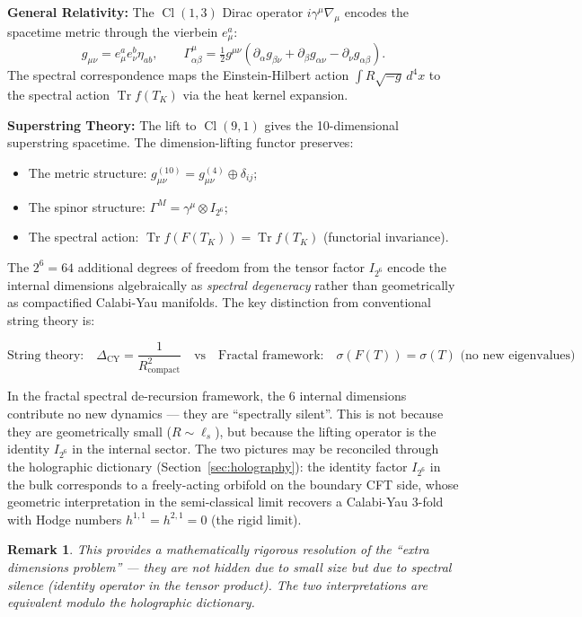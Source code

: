 \documentclass[12pt,a4paper]{article}
\newtheorem{remark}[theorem]{Remark}
\newcommand{\Cl}{\operatorname{Cl}}
\newcommand{\Tr}{\operatorname{Tr}}
\begin{document}
\textbf{General Relativity:} The $\Cl(1,3)$ Dirac operator $i\gamma^\mu\nabla_\mu$ encodes 
the spacetime metric through the vierbein $e^a_\mu$:
\begin{equation}
g_{\mu\nu} = e^a_\mu e^b_\nu \eta_{ab}, \qquad 
\Gamma^\mu_{\alpha\beta} = \tfrac12 g^{\mu\nu}(\partial_\alpha g_{\beta\nu} + \partial_\beta g_{\alpha\nu} - \partial_\nu g_{\alpha\beta}).
\end{equation}
The spectral correspondence maps the Einstein-Hilbert action $\int R\sqrt{-g}\,d^4x$ 
to the spectral action $\Tr f(T_K)$ via the heat kernel expansion.

\textbf{Superstring Theory:} The lift to $\Cl(9,1)$ gives the 10-dimensional 
superstring spacetime. The dimension-lifting functor preserves:
\begin{itemize}
  \item The metric structure: $g_{\mu\nu}^{(10)} = g_{\mu\nu}^{(4)} \oplus \delta_{ij}$;
  \item The spinor structure: $\Gamma^M = \gamma^\mu \otimes I_{2^6}$;
  \item The spectral action: $\Tr f(F(T_K)) = \Tr f(T_K)$ (functorial invariance).
\end{itemize}

The $2^6 = 64$ additional degrees of freedom from the tensor factor $I_{2^6}$ 
encode the internal dimensions algebraically as \emph{spectral degeneracy} rather 
than geometrically as compactified Calabi-Yau manifolds. The key distinction from 
conventional string theory is:

\[
\text{String theory:}\quad \Delta_{\text{CY}} = \frac{1}{R^2_{\text{compact}}} 
\quad\text{vs}\quad 
\text{Fractal framework:}\quad \sigma(F(T)) = \sigma(T)\text{ (no new eigenvalues)}
\]

In the fractal spectral de-recursion framework, the $6$ internal dimensions 
contribute no new dynamics --- they are ``spectrally silent''. This is not because 
they are geometrically small ($R \sim \ell_s$), but because the lifting operator 
is the identity $I_{2^6}$ in the internal sector. The two pictures may be 
reconciled through the holographic dictionary (Section~\ref{sec:holography}): 
the identity factor $I_{2^6}$ in the bulk corresponds to a freely-acting orbifold 
on the boundary CFT side, whose geometric interpretation in the semi-classical 
limit recovers a Calabi-Yau 3-fold with Hodge numbers $h^{1,1}=h^{2,1}=0$ 
(the rigid limit).

\begin{remark}
This provides a mathematically rigorous resolution of the ``extra dimensions 
problem'' --- they are not hidden due to small size but due to spectral 
silence (identity operator in the tensor product). The two interpretations 
are equivalent modulo the holographic dictionary.
\end{remark}
\end{document}
